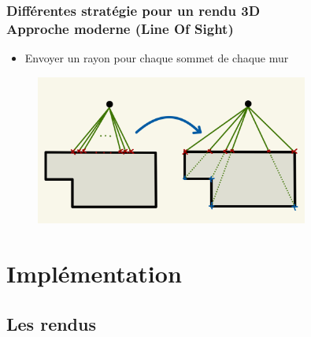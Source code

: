 \documentclass{beamer}
\begin{document}
\begin{frame}
    \frametitle{Différentes stratégie pour un rendu 3D \\
                \small Approche moderne (Line Of Sight)}    
                
    
    \begin{block}{}
        \begin{itemize} 
            \item Envoyer un rayon pour chaque sommet de chaque mur
        \end{itemize}

    \end{block}    


    \begin{figure}
        \centering
        \includegraphics[width=0.8\textwidth]{images/comparaison-deux-methodes.jpeg}
    \end{figure}
\end{frame}


\section{Implémentation}

\subsection{Les rendus}
\end{document}
